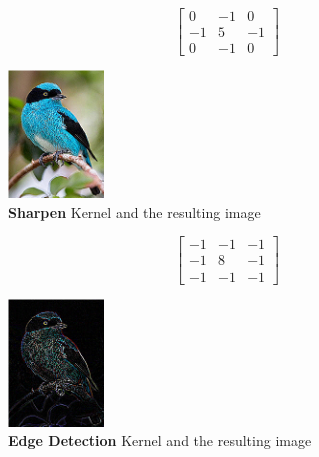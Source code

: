 \FloatBarrier
\begin{figure}[h]
\begin{minipage}[b]{0.5\linewidth}
\centering
    $$
    \quad
    \begin{bmatrix} 
    0 & -1 & 0 \\
    -1 & 5 & -1 \\
    0 & -1 & 0
    \end{bmatrix}
    $$
\caption{\textbf{Sharpen} Kernel and the resulting image}
\end{minipage}
\begin{minipage}[b]{0.3\linewidth}
\centering
\includegraphics[width=1in]{graphics/convolution/Convolution_gebs_KernelSharpen.png}
\end{minipage}
\label{fig:Sharpen Kernel}
\end{figure}
\FloatBarrier
\begin{figure}[h]
\begin{minipage}[b]{0.5\linewidth}
\centering
    $$
    \quad
    \begin{bmatrix} 
    -1 & -1 & -1 \\
    -1 & 8 & -1 \\
    -1 & -1 & -1
    \end{bmatrix}
    $$
\caption{\textbf{Edge Detection} Kernel and the resulting image}
\end{minipage}
\begin{minipage}[b]{0.3\linewidth}
\centering
\includegraphics[width=1in]{graphics/convolution/Convolution_gebs_KernelEdgeDetection.png}
\end{minipage}
\label{fig:Edge Detection Kernel}
\end{figure}
\FloatBarrier
